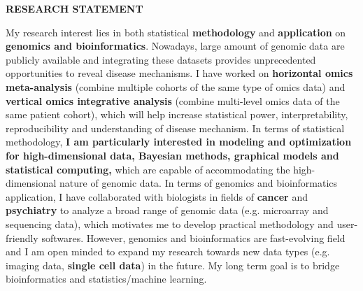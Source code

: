 \documentclass[a4paper, 10pt]{article}
\begin{document}
\thispagestyle{fancy}
\lhead{}
\rhead{}
\renewcommand{\headrulewidth}{0pt} 
\renewcommand{\footrulewidth}{0pt} 


\pagestyle{fancy}
\lhead{\textcolor{gray}{\it Zhiguang Huo (Caleb)}}


\begin{center}
{\LARGE \bf RESEARCH STATEMENT}\\
\vspace*{0.1cm}
\end{center}


My research interest lies in both statistical \textbf{methodology} and \textbf{application} on \textbf{genomics and bioinformatics}.
Nowadays, large amount of genomic data are publicly available and 
integrating these datasets provides unprecedented opportunities to reveal disease mechanisms.
I have worked on \textbf{horizontal omics meta-analysis} (combine multiple cohorts of the same type of omics data) and 
\textbf{vertical omics integrative analysis} (combine multi-level omics data of the same patient cohort),
which will help increase statistical power, interpretability, reproducibility and understanding of disease mechanism.
In terms of statistical methodology,
\textbf{I am particularly interested in modeling and optimization for high-dimensional data, Bayesian methods, graphical models and statistical computing,}
which are capable of accommodating the high-dimensional nature of genomic data.
In terms of genomics and bioinformatics application,
I have collaborated with biologists in fields of \textbf{cancer} and \textbf{psychiatry} to analyze a broad range of genomic data (e.g. microarray and sequencing data),
which motivates me to develop practical methodology and user-friendly softwares.
However, genomics and bioinformatics are fast-evolving field and 
I am open minded to expand my research towards new data types (e.g. imaging data, \textbf{single cell data}) in the future.
My long term goal is to bridge bioinformatics and statistics/machine learning.
\end{document}
